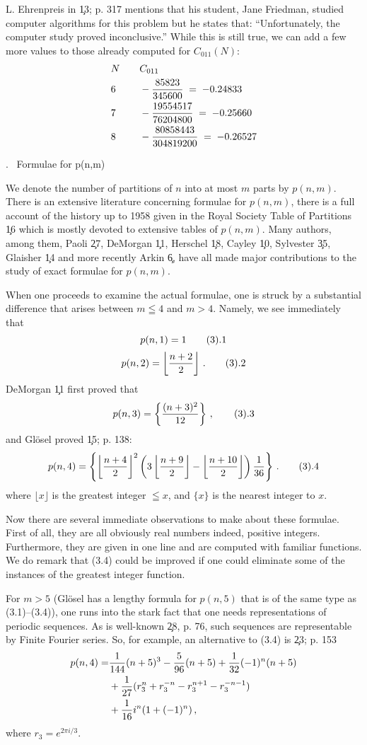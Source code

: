 L. Ehrenpreis in \c{13; p. 317} mentions that his student, Jane
Friedman, studied computer algorithms for this problem but he states
that: ``Unfortunately, the computer study proved inconclusive.''
While this is still true, we can add a few more values to those
already computed for $C_{011}(N)$:
$$
\alignedat3
	& N & \qquad & C_{011}  \\
	& 6 & \qquad & - \fr{85823}{345600} \; = \; -0.24833  \\
	& 7 & \qquad & - \fr{19554517}{76204800} \; = \; -0.25660 \\
	& 8 & \qquad & - \fr{80858443}{304819200} \; = \; -0.26527
\endalignedat
$$

. \ Formulae for p(n,m)
\endsubhead

We denote the number of partitions of $n$ into at most $m$ parts by
$p(n,m)$.  There is an extensive literature concerning formulae for
$p(n,m)$, there is a full account of the history up to 1958 given in
the Royal Society Table of Partitions \c{16} which is mostly devoted
to extensive tables of $p(n,m)$.  Many authors, among them, Paoli
\c{27}, DeMorgan \c{11}, Herschel \c{18}, Cayley \c{10}, Sylvester
\c{35}, Glaisher \c{14} and more recently Arkin \c6,
have all made major contributions to the study of exact formulae for 
$p(n,m)$.

When one proceeds to examine the actual formulae, one is struck by a
substantial difference that arises between $m \leqq 4$ and $m > 4$.
Namely, we see immediately that
$$
	p(n,1) = 1
\tag3.1
$$
$$
	p(n,2) = \left\lfloor \fr{n+2}{2}\right\rfloor\,.
\tag3.2
$$
DeMorgan \c{11} first proved that
$$
	p(n,3) = \left\{ \fr{(n+3)^2}{12} \right\}\,,
\tag3.3
$$
and Gl\"osel proved \c{15; p. 138}:
$$
	p(n,4) = \left\{ \left\lfloor \fr{n+4}{2}\right\rfloor^2 \left( 3
	\left\lfloor \fr{n+9}{2} \right\rfloor - \left\lfloor 
	\fr{n+10}{2}\right\rfloor \right) \fr1{36}\right\}\,.
\tag3.4
$$
where $\lfloor x \rfloor$ is the greatest integer $\leqq x$, and
$\{x\}$ is the nearest integer to $x$.

Now there are several immediate observations to make about these
formulae.  First of all, they are all obviously real numbers indeed,
positive integers.  Furthermore, they are given in one line and are
computed with familiar functions.  We do remark that (3.4) could be
improved if one could eliminate some of the instances of the greatest
integer function.

For $m > 5$ (Gl\"osel has a lengthy formula for $p(n,5)$ that is of
the same type as (3.1)--(3.4)), one runs into the stark fact that one
needs representations of periodic sequences.  As is well-known \c{28,
p. 76}, such sequences are representable by Finite Fourier series.
So, for example, an alternative to (3.4) is \c{23; p. 153}
$$
\aligned
	p(n,4) = & \fr1{144} (n + 5)^3 - \fr5{96} (n + 5) + \fr1{32}
	(-1)^n (n + 5) \\
	& + \fr1{27} (r_3^n + r_3^{-n} - r_3^{n+1} - r_3^{-n-1})
	\\
	& + \fr1{16} i^n (1 + (-1)^n)\,,
\endaligned
$$
where $r_3 = e^{2\pi i/3}$.

